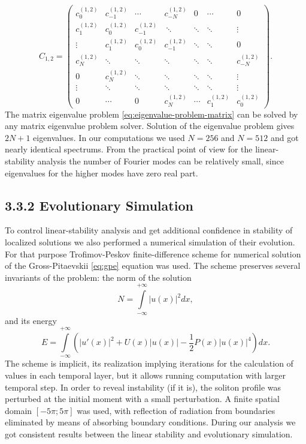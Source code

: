 \begin{equation}
	C_{1,2} =
	\begin{pmatrix}
		c_0^{(1,2)} & c_{-1}^{(1,2)} & \cdots & c_{-N}^{(1,2)} & 0 & \cdots & 0 \\
		c_1^{(1,2)} & c_0^{(1,2)} & c_{-1}^{(1,2)} & \ \ddots & \ddots & \ddots & \vdots \\
		\vdots & c_1^{(1,2)} & c_0^{(1,2)} & c_{-1}^{(1,2)} & \ddots & \ddots & 0 \\
		c_N^{(1,2)} & \ddots & \ddots & \ddots & \ddots & \ddots & c_{-N}^{(1,2)} \\
		0 & c_N^{(1,2)} & \ddots & \ddots & \ddots & \ddots & \vdots \\
		\vdots & \ddots & \ddots & \ddots & \ddots & \ddots & \vdots \\
		0 & \cdots & 0 & c_N^{(1,2)} & \cdots & c_1^{(1,2)} & c_0^{(1,2)}
	\end{pmatrix}.
\end{equation}
The matrix eigenvalue problem \eqref{eq:eigenvalue-problem-matrix} can be solved by any matrix eigenvalue problem solver.
Solution of the eigenvalue problem gives $2N + 1$ eigenvalues.
In our computations we used $N = 256$ and $N = 512$ and got nearly identical spectrums.
From the practical point of view for the linear-stability analysis the number of Fourier modes can be relatively small, since eigenvalues for the higher modes have zero real part.

\subsection*{3.3.2 Evolutionary Simulation}

To control linear-stability analysis and get additional confidence in stability of localized solutions we also performed a numerical simulation of their evolution.
For that purpose Trofimov-Peskov finite-difference scheme \cite{TrofimovPeskov} for numerical solution of the Gross-Pitaevskii \eqref{eq:gpe} equation was used. 
The scheme preserves several invariants of the problem: the norm of the solution
\begin{equation}
	N = \int \limits_{-\infty}^{+\infty} |u(x)|^2 dx,
\label{eq:norm}
\end{equation}
and its energy
\begin{equation}
	E = \int \limits_{-\infty}^{+\infty} \left( |u'(x)|^2 + U(x) |u(x)| - \dfrac{1}{2} P(x) |u(x)|^4 \right) dx.
\label{eq:energy}
\end{equation}
The scheme is implicit, its realization implying iterations for the calculation of values in each temporal layer, but it allows running computation with larger temporal step.
In order to reveal instability (if it is), the soliton profile was perturbed at the initial moment with a small perturbation.
A finite spatial domain $[-5 \pi; 5 \pi]$ was used, with reflection of radiation from boundaries eliminated by means of absorbing boundary conditions.
During our analysis we got consistent results between the linear stability and evolutionary simulation.

